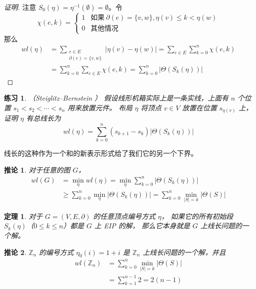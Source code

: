 \documentclass[12pt, a4paper]{article}
\newtheorem{theorem}{定理}
\newtheorem{corollary}{推论}
\newtheorem{exercise}{练习}
\begin{document}
\begin{proof}[证明]
注意 $S_0(\eta) = \eta^{−1}(\emptyset) = \emptyset$。令
\begin{equation*}
\chi(e, k) = \begin{cases}
	1 & \text{如果}\ \partial(e) = \{v, w\}, \eta(v) \le k < \eta(w) \\
	0 & \text{其他情况}
\end{cases}
\end{equation*}
那么
\begin{align*}
wl(\eta) & = \sum_{\substack{
		     e \in E \\
		     \partial(e) = \{v, w\}
	     }} |\eta(v) - \eta(w)| = \sum_{e \in E} \sum_{k = 0}^n \chi(e, k) \\
	 & = \sum_{k = 0}^n \sum_{e \in E} \chi(e, k)
	   = \sum_{k = 0}^n |\Theta(S_k(\eta))|
\end{align*}
\end{proof}

\begin{exercise}
\label{Exercise 11}
（Steiglitz–Bernstein \cite{Steiglitz.1965}）
假设线形机箱实际上是一条实线，上面有 $n$ 个位置 $s_1 < s_2 < \cdots < s_n$ 用来放置元件。
布局 $\eta$ 将顶点 $v \in V$ 放置在位置 $s_{\eta(v)}$ 上，证明 $\eta$ 有总线长为
\begin{equation*}
wl(\eta) = \sum_{k = 0}^n (s_{k + 1} - s_k) |\Theta(S_k(\eta))|
\end{equation*}
\end{exercise}

线长的这种作为一个和的新表示形式给了我们它的另一个下界。

\begin{corollary}
\label{Corollary 2}
对于任意的图 $G$，
\begin{align*}
wl(G) & = \min_{\eta} wl(\eta)
	= \min_{\eta} \sum_{k = 0}^n |\Theta(S_k(\eta))| \\
      & \ge \sum_{k = 0}^n \min_{\eta} |\Theta(S_k(\eta))|
	= \sum_{k = 0}^n \min_{|S| = k} |\Theta(S)|
\end{align*}
\end{corollary}

\begin{theorem}
\label{Theorem 2}
对于 $G = (V, E, \partial)$ 的任意顶点编号方式 $\eta$，
如果它的所有初始段 $S_k(\eta)$（$0 \le k \le n$）都是 $G$ 上 EIP 的解，
那么它本身就是 $G$ 上线长问题的一个解。
\end{theorem}

\begin{corollary}
\label{Corollary 3}
$\mathbb{Z}_n$ 的编号方式 $\eta_0(i) = 1 + i$ 是 $\mathbb{Z}_n$ 上线长问题的一个解，并且
\begin{align*}
wl(\mathbb{Z}_n) & = \sum_{k = 0}^n \min_{|S| = k} |\Theta(S)| \\
		 & = \sum_{k = 1}^{n - 1} 2 = 2 (n - 1)
\end{align*}
\end{corollary}
\end{document}
